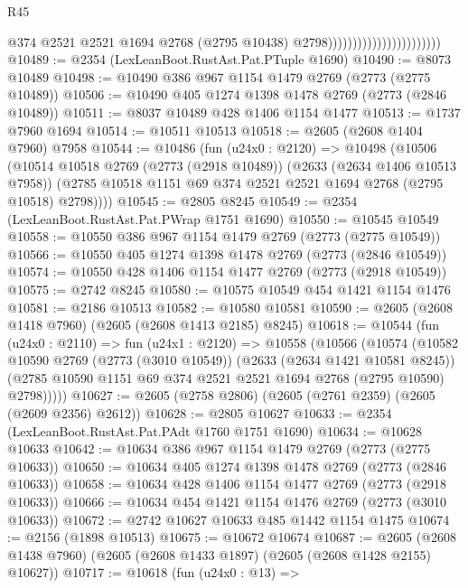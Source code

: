 \begin{lexlean}{R45}
\begin{coremodule}
                                                  @374
                                                  @2521
                                                  @2521
                                                  @1694
                                                  @2768
                                                  (@2795 @10438)
                                                  @2798)))))))))))))))))))))))
@10489 := @2354 (LexLeanBoot.RustAst.Pat.PTuple @1690)
@10490 := @8073 @10489
@10498 := @10490 @386 @967 @1154 @1479 @2769 (@2773 (@2775 @10489))
@10506 := @10490 @405 @1274 @1398 @1478 @2769 (@2773 (@2846 @10489))
@10511 := @8037 @10489 @428 @1406 @1154 @1477
@10513 := @1737 @7960 @1694
@10514 := @10511 @10513
@10518 := @2605 (@2608 @1404 @7960) @7958
@10544 := @10486
    (fun (u24x0 : @2120) =>
    @10498
      (@10506
        (@10514
          @10518
          @2769
          (@2773 (@2918 @10489))
          (@2633 (@2634 @1406 @10513 @7958))
          (@2785 @10518 @1151 @69 @374 @2521 @2521 @1694 @2768 (@2795 @10518) @2798))))
@10545 := @2805 @8245
@10549 := @2354 (LexLeanBoot.RustAst.Pat.PWrap @1751 @1690)
@10550 := @10545 @10549
@10558 := @10550 @386 @967 @1154 @1479 @2769 (@2773 (@2775 @10549))
@10566 := @10550 @405 @1274 @1398 @1478 @2769 (@2773 (@2846 @10549))
@10574 := @10550 @428 @1406 @1154 @1477 @2769 (@2773 (@2918 @10549))
@10575 := @2742 @8245
@10580 := @10575 @10549 @454 @1421 @1154 @1476
@10581 := @2186 @10513
@10582 := @10580 @10581
@10590 := @2605 (@2608 @1418 @7960) (@2605 (@2608 @1413 @2185) @8245)
@10618 := @10544
    (fun (u24x0 : @2110) =>
    fun (u24x1 : @2120) =>
    @10558
      (@10566
        (@10574
          (@10582
            @10590
            @2769
            (@2773 (@3010 @10549))
            (@2633 (@2634 @1421 @10581 @8245))
            (@2785 @10590 @1151 @69 @374 @2521 @2521 @1694 @2768 (@2795 @10590) @2798)))))
@10627 := @2605 (@2758 @2806) (@2605 (@2761 @2359) (@2605 (@2609 @2356) @2612))
@10628 := @2805 @10627
@10633 := @2354 (LexLeanBoot.RustAst.Pat.PAdt @1760 @1751 @1690)
@10634 := @10628 @10633
@10642 := @10634 @386 @967 @1154 @1479 @2769 (@2773 (@2775 @10633))
@10650 := @10634 @405 @1274 @1398 @1478 @2769 (@2773 (@2846 @10633))
@10658 := @10634 @428 @1406 @1154 @1477 @2769 (@2773 (@2918 @10633))
@10666 := @10634 @454 @1421 @1154 @1476 @2769 (@2773 (@3010 @10633))
@10672 := @2742 @10627 @10633 @485 @1442 @1154 @1475
@10674 := @2156 (@1898 @10513)
@10675 := @10672 @10674
@10687 := @2605 (@2608 @1438 @7960) (@2605 (@2608 @1433 @1897) (@2605 (@2608 @1428 @2155) @10627))
@10717 := @10618
    (fun (u24x0 : @13) =>

\end{coremodule}
\end{lexlean}
